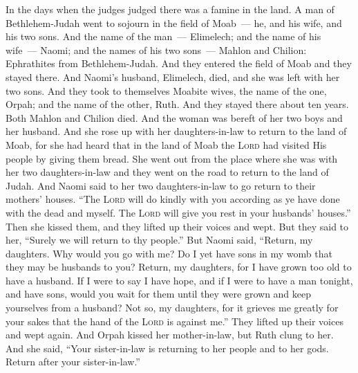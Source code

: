 
\begin{inparaenum}
   In the days when the judges judged there was a famine in the land. A man of Bethlehem-Judah went to sojourn in the field of Moab~--- he, and his wife, and his two sons.%
   And the name of the man~--- Elimelech; and the name of his wife~--- Naomi; and the names of his two sons~--- Mahlon and Chilion: Ephrathites from Bethlehem-Judah. And they entered the field of Moab and they stayed there.%
   And Naomi's husband, Elimelech, died, and she was left with her two sons.%
   And they took to themselves Moabite wives, the name of the one, Orpah; and the name of the other, Ruth. And they stayed there about ten years.%
   Both Mahlon and Chilion died. And the woman was bereft of her two boys and her husband.%
   And she rose up with her daughters-in-law to return to the land of Moab, for she had heard that in the land of Moab the \textsc{Lord} had visited His people by giving them bread.%
   She went out from the place where she was with her two daughters-in-law and they went on the road to return to the land of Judah.%
   And Naomi said to her two daughters-in-law to go return to their mothers' houses. ``The \textsc{Lord} will do kindly with you according as ye have done with the dead and myself.%
   The \textsc{Lord} will give you rest in your husbands' houses.'' Then she kissed them, and they lifted up their voices and wept.%
   But they said to her, ``Surely we will return to thy people.''%
   But Naomi said, ``Return, my daughters. Why would you go with me? Do I yet have sons in my womb that they may be husbands to you?%
   Return, my daughters, for I have grown too old to have a husband. If I were to say I have hope, and if I were to have a man tonight, and have sons,%
   would you wait for them until they were grown and keep yourselves from a husband? Not so, my daughters, for it grieves me greatly for your sakes that the hand of the \textsc{Lord} is against me.''%
   They lifted up their voices and wept again. And Orpah kissed her mother-in-law, but Ruth clung to her.%
   And she said, ``Your sister-in-law is returning to her people and to her gods. Return after your sister-in-law.''%

\end{inparaenum}
